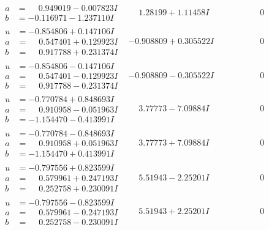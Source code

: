 \documentclass[1p]{elsarticle_modified}
\theoremstyle{definition}
\begin{document}
$$\begin{array}{c|c|c}
\begin{aligned}
a &= \phantom{-}0.949019 - 0.007823 I \\
b &= -0.116971 - 1.237110 I\end{aligned}
 & \phantom{-}1.28199 + 1.11458 I & \phantom{-0.000000 } 0 \\ \hline\begin{aligned}
u &= -0.854806 + 0.147106 I \\
a &= \phantom{-}0.547401 + 0.129923 I \\
b &= \phantom{-}0.917788 + 0.231374 I\end{aligned}
 & -0.908809 + 0.305522 I & \phantom{-0.000000 } 0 \\ \hline\begin{aligned}
u &= -0.854806 - 0.147106 I \\
a &= \phantom{-}0.547401 - 0.129923 I \\
b &= \phantom{-}0.917788 - 0.231374 I\end{aligned}
 & -0.908809 - 0.305522 I & \phantom{-0.000000 } 0 \\ \hline\begin{aligned}
u &= -0.770784 + 0.848693 I \\
a &= \phantom{-}0.910958 - 0.051963 I \\
b &= -1.154470 - 0.413991 I\end{aligned}
 & \phantom{-}3.77773 - 7.09884 I & \phantom{-0.000000 } 0 \\ \hline\begin{aligned}
u &= -0.770784 - 0.848693 I \\
a &= \phantom{-}0.910958 + 0.051963 I \\
b &= -1.154470 + 0.413991 I\end{aligned}
 & \phantom{-}3.77773 + 7.09884 I & \phantom{-0.000000 } 0 \\ \hline\begin{aligned}
u &= -0.797556 + 0.823599 I \\
a &= \phantom{-}0.579961 + 0.247193 I \\
b &= \phantom{-}0.252758 + 0.230091 I\end{aligned}
 & \phantom{-}5.51943 - 2.25201 I & \phantom{-0.000000 } 0 \\ \hline\begin{aligned}
u &= -0.797556 - 0.823599 I \\
a &= \phantom{-}0.579961 - 0.247193 I \\
b &= \phantom{-}0.252758 - 0.230091 I\end{aligned}
 & \phantom{-}5.51943 + 2.25201 I & \phantom{-0.000000 } 0 \\ \hline\begin{aligned}

\end{aligned}
\end{array}$$
\end{document}
